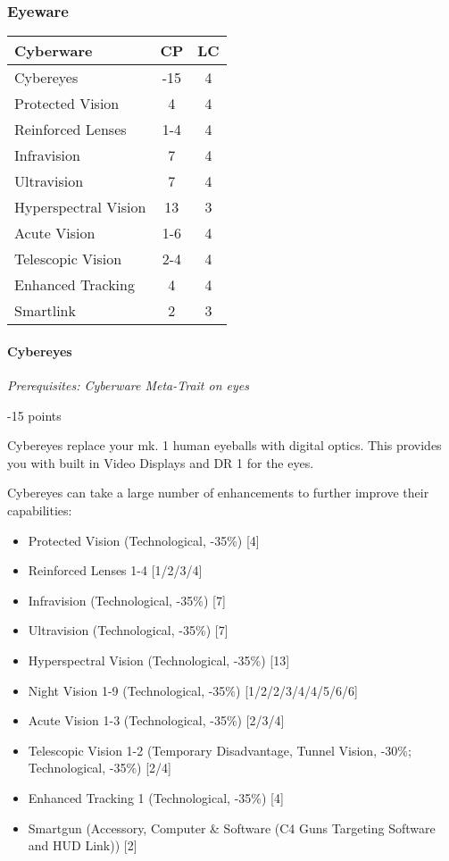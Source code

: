 \begin{multicols*}{3}
	\subsubsection{Eyeware}
	
	\begin{center}
		\begin{tabularx}{0.32\textwidth}{|X|c|c|}
			\hline
			Cyberware & CP & LC\\
			\hline
			\hline
			Cybereyes & -15 & 4 \\
			\hline
			Protected Vision & 4 & 4 \\
			Reinforced Lenses & 1-4 & 4 \\
			Infravision & 7 & 4 \\
			Ultravision & 7 & 4 \\
			Hyperspectral Vision & 13 & 3 \\
			Acute Vision & 1-6 & 4 \\
			Telescopic Vision & 2-4 & 4 \\
			Enhanced Tracking & 4 & 4 \\
			Smartlink & 2 & 3 \\
			\hline
		\end{tabularx}
	\end{center}
	
	\paragraph{Cybereyes}
	\textit{Prerequisites: Cyberware Meta-Trait on eyes}
	\begin{flushright}
		-15 points
	\end{flushright}
	
	Cybereyes replace your mk. 1 human eyeballs with digital optics. This provides you with built in Video Displays and DR 1 for the eyes.
	
	Cybereyes can take a large number of enhancements to further improve their capabilities: 
	
	\begin{itemize}
		\item Protected Vision (Technological, -35\%) [4]
		\item Reinforced Lenses 1-4 [1/2/3/4]
		\item Infravision (Technological, -35\%) [7]
		\item Ultravision (Technological, -35\%) [7]
		\item Hyperspectral Vision (Technological, -35\%) [13]
		\item Night Vision 1-9 (Technological, -35\%) [1/2/2/3/4/4/5/6/6]
		\item Acute Vision 1-3 (Technological, -35\%) [2/3/4]
		\item Telescopic Vision 1-2 (Temporary Disadvantage, Tunnel Vision, -30\%; Technological, -35\%) [2/4]
		\item Enhanced Tracking 1 (Technological, -35\%) [4]
		\item Smartgun (Accessory, Computer \& Software (C4 Guns Targeting Software and HUD Link)) [2]
	\end{itemize}


\end{multicols*}

